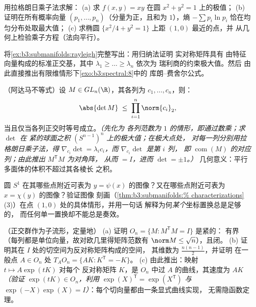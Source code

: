 \begin{exercise}[$\star\star$]\label{exo:b3:submanifolds:7}
用拉格朗日乘子法求解：
(a) 求 $f(x,y) = xy$ 在圆 $x^2 +
y^2 = 1$ 上的极值；
(b) 证明在所有概率向量 $(p_1, \dots,
p_n)$（分量为正，且和为 $1$），熵 $-\sum
p_i\ln p_i$ 恰在均匀分布处取最大值；
(c) 求椭圆 $\{x^2/4 + y^2 = 1\}$
上距 $(1, 0)$ 最近的点，并
从几何上检验乘子方程（法向平行）。
\end{exercise}

\begin{exercise}[$\star\star\star$]\label{exo:b3:submanifolds:8}
将\cref{ex:b3:submanifolds:rayleigh}完整写出：用归纳法证明
实对称矩阵具有
由特征向量构成的标准正交基，其中
$\lambda_1 \geq \dots \geq \lambda_n$ 依次为
瑞利商的约束极大值。然后
由此直接推出有限维情形下\cref{exo:b3:spectral:8}中的
库朗–费舍尔公式。
\end{exercise}

\begin{exercise}[$\star\star\star$]\label{exo:b3:submanifolds:9}
（阿达马不等式）设 $M \in GL_n(\R)$，其各列为
$c_1, \dots, c_n$，则：
\[
\abs{\det M} \;\leq\; \prod_{i=1}^n\norm{c_i}_2 ,
\]
当且仅当各列正交时等号成立。\emph{（先化为
各列范数为 $1$ 的情形，即通过数乘；求 $\det$ 在
紧的球面之积 $(S^{n-1})^n$ 上的极大值；在极大点处，
对每一列分别用拉格朗日乘子法，得 $\nabla_{c_i}\det =
\lambda_ic_i$，而 $\nabla_{c_i}\det$ 是第 $i$ 列，
即 $\operatorname{com}(M)$ 的对应列；由此推出 $M^{\mathsf T}M$ 为对角阵，
从而 $= I$，进而 $\det = \pm1$。）} 几何意义：平行
多面体的体积不超过其各棱长
之积。
\end{exercise}

\begin{exercise}[$\star\star$]\label{exo:b3:submanifolds:10}
圆 $S^1$ 在其哪些点附近可表为 $y =
\psi(x)$ 的图像？又在哪些点附近可表为 $x = \chi(y)$ 的图像？验证图像
刻画（\cref{thm:b3:submanifolds:%
characterizations}(3)）在点 $(1, 0)$ 处的具体情形，并用一句话
解释为何\emph{某个}坐标置换总是足够的，
而任何单一置换却不能总是奏效。
\end{exercise}

\begin{exercise}[$\star\star$]\label{exo:b3:submanifolds:11}
（正交群作为子流形，定量地）
(a) 证明 $O_n = \{M : M^{\mathsf T}M = I\}$ 是紧的：
有界（每列都是单位向量，故对欧几里得矩阵范数有 $\norm M \leq
\sqrt n$），且闭。
(b) 证明其在 $I$ 处的切空间为反对称矩阵构成的空间，
其维数为 $\frac{n(n-1)}2$，并证明
在一般点 $A \in O_n$ 处 $T_AO_n = \{AK : K^{\mathsf T} =
-K\}$。
(c) 由此推出：映射 $t \mapsto A\exp(tK)$ 对每个
反对称矩阵 $K$，是 $O_n$ 中过 $A$ 的曲线，其速度为 $AK$ \emph{（验证
$\exp(tK) \in O_n$，利用
$\exp(X)^{\mathsf T} = \exp(X^{\mathsf T})$ 与
$\exp(-X)\exp(X) = I$）}：每个切向量都由一条显式曲线实现，
无需隐函数定理。
\end{exercise}

